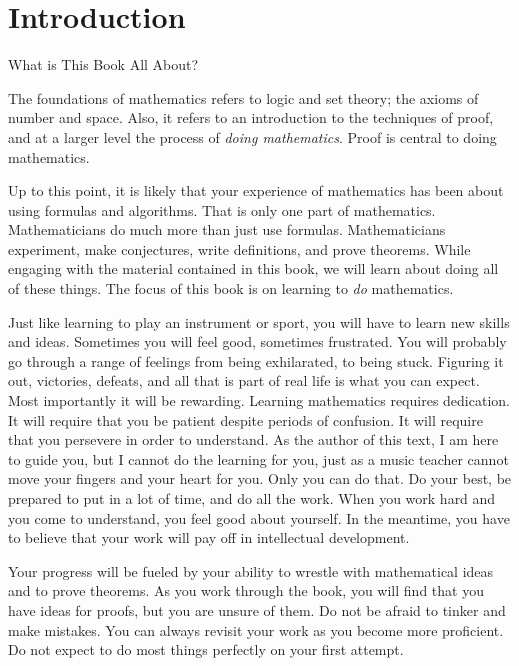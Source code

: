 \chapter{Introduction}\label{chap:intro}


\begin{section}{What is This Book All About?}%

The foundations of mathematics refers to logic and set theory; the axioms of number and space.  Also, it refers to an introduction to the techniques of proof, and at a larger level the process of \emph{doing mathematics}.  Proof is central to doing mathematics.

Up to this point, it is likely that your experience of mathematics has been about using formulas and algorithms. That is only one part of mathematics. Mathematicians do much more than just use formulas.  Mathematicians experiment, make conjectures, write definitions, and prove theorems.  While engaging with the material contained in this book, we will learn about doing all of these things. The focus of this book is on learning to \emph{do} mathematics. 
  
Just like learning to play an instrument or sport, you will have to learn new skills and ideas.  Sometimes you will feel good, sometimes frustrated.  You will probably go through a range of feelings from being exhilarated, to being stuck.  Figuring it out, victories, defeats, and all that is part of real life is what you can expect.  Most importantly it will be rewarding.  Learning mathematics requires dedication.  It will require that you be patient despite periods of confusion.  It will require that you persevere in order to understand.  As the author of this text, I am here to guide you, but I cannot do the learning for you, just as a music teacher cannot move your fingers and your heart for you.  Only you can do that.  Do your best, be prepared to put in a lot of time, and do all the work. When you work hard and you come to understand, you feel good about yourself.  In the meantime, you have to believe that your work will pay off in intellectual development.

Your progress will be fueled by your ability to wrestle with mathematical ideas and to prove theorems.  As you work through the book, you will find that you have ideas for proofs, but you are unsure of them.  Do not be afraid to tinker and make mistakes.  You can always revisit your work as you become more proficient. Do not expect to do most things perfectly on your first attempt. 


\end{section}
